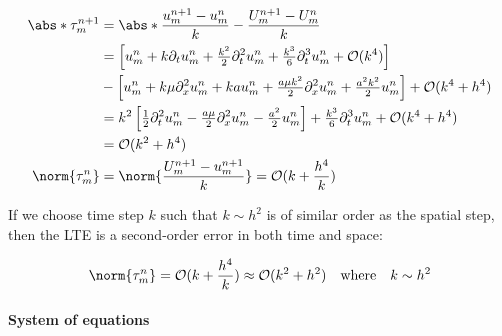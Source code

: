 \begin{align*}
  \abs*{\tau_m^{n+1}} & = \abs*{\dfrac{u_m^{n+1} - u_m^n}{k} - \dfrac{U_m^{n+1} - U_m^n}{k}} \\
                      & = \left[ u_m^n + k\partial_t u_m^n + \tfrac{k^2}{2}\partial_t^2 u_m^n + \tfrac{k^3}{6}\partial_t^3 u_m^n + \mathcal{O}(k^4) \right]                                      \\
                      & - \left[ u_m^n + k\mu\partial_{x}^2 u_m^n + kau_m^n + \tfrac{a\mu k^2}{2}\partial_{x}^2 u_m^n + \tfrac{a^2k^2}{2}u_m^n \right] + \mathcal{O}(k^4+h^4)                    \\
                      & = k^2 \left[\tfrac{1}{2}\partial_t^2 u_m^n - \tfrac{a \mu}{2}\partial_{x}^2 u_m^n - \tfrac{a^2}{2}u_m^n\right] + \tfrac{k^3}{6}\partial_t^3 u_m^n + \mathcal{O}(k^4+h^4) \\
                      & = \mathcal{O}(k^2 + h^4)                                                                                                                                                 \\
  \norm{\tau_m^n}     & = \norm{\frac{U_m^{n+1} - u_m^{n+1}}{k}} = \mathcal{O}(k + \frac{h^4}{k})                                                                                                \\
\end{align*}

If we choose time step \(k\) such that \(k \sim h^2\) is of similar order as the spatial step, then the LTE is a second-order error in both time and space:

\[
  \norm{\tau_m^n} = \mathcal{O}(k + \frac{h^4}{k}) \approx \mathcal{O}(k^2 + h^2) \quad \text{where} \quad k \sim h^2
\]



\paragraph{System of equations}

